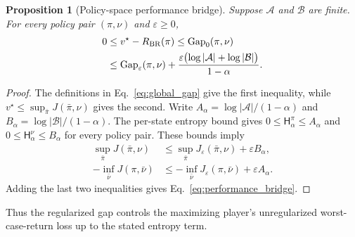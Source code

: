 \documentclass{article}
\newtheorem{proposition}{Proposition}
\theoremstyle{remark}
\begin{document}
\begin{proposition}[Policy-space performance bridge]\label{prop:performance_bridge}
Suppose $\mathcal A$ and $\mathcal B$ are finite.
For every policy pair $(\pi,\nu)$ and $\varepsilon\ge0$,
\begin{equation}\label{eq:performance_bridge}
\begin{aligned}
0&\le v^{\star}-R_{\rm BR}(\pi)
\le \operatorname{Gap}_{0}(\pi,\nu)\\
&\le \operatorname{Gap}_{\varepsilon}(\pi,\nu)
+\frac{\varepsilon\bigl(\log|\mathcal A|+\log|\mathcal B|\bigr)}{1-\alpha}.
\end{aligned}
\end{equation}
\end{proposition}
\begin{proof}
The definitions in Eq.~\eqref{eq:global_gap} give the first inequality, while $v^{\star}\le\sup_{\bar\pi}J(\bar\pi,\nu)$ gives the second.
Write $A_\alpha=\log|\mathcal A|/(1-\alpha)$ and $B_\alpha=\log|\mathcal B|/(1-\alpha)$.
The per-state entropy bound gives $0\le\mathsf H_\alpha^\pi\le A_\alpha$ and $0\le\mathsf H_\alpha^\nu\le B_\alpha$ for every policy pair.
These bounds imply
\begin{align*}
\sup_{\bar\pi}J(\bar\pi,\nu)
&\le \sup_{\bar\pi}J_\varepsilon(\bar\pi,\nu)+\varepsilon B_\alpha,\\
-\inf_{\bar\nu}J(\pi,\bar\nu)
&\le -\inf_{\bar\nu}J_\varepsilon(\pi,\bar\nu)+\varepsilon A_\alpha.
\end{align*}
Adding the last two inequalities gives Eq.~\eqref{eq:performance_bridge}.
\end{proof}

Thus the regularized gap controls the maximizing player's unregularized worst-case-return loss up to the stated entropy term.
\end{document}
